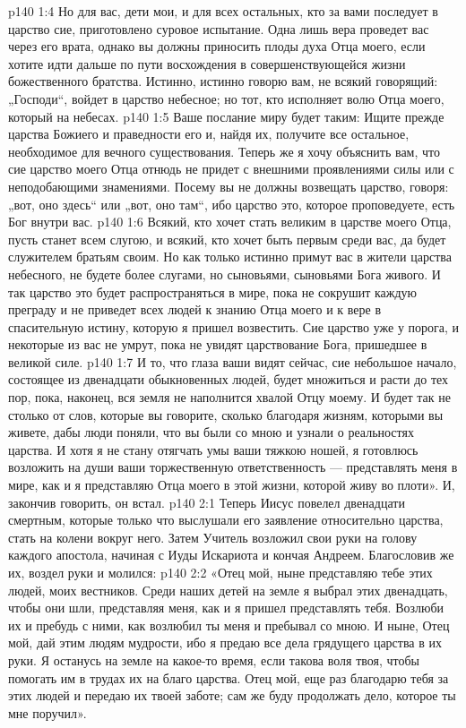 \vs p140 1:4 Но для вас, дети мои, и для всех остальных, кто за вами последует в царство сие, приготовлено суровое испытание. Одна лишь вера проведет вас через его врата, однако вы должны приносить плоды духа Отца моего, если хотите идти дальше по пути восхождения в совершенствующейся жизни божественного братства. Истинно, истинно говорю вам, не всякий говорящий: „Господи“, войдет в царство небесное; но тот, кто исполняет волю Отца моего, который на небесах.
\vs p140 1:5 Ваше послание миру будет таким: Ищите прежде царства Божиего и праведности его и, найдя их, получите все остальное, необходимое для вечного существования. Теперь же я хочу объяснить вам, что сие царство моего Отца отнюдь не придет с внешними проявлениями силы или с неподобающими знамениями. Посему вы не должны возвещать царство, говоря: „вот, оно здесь“ или „вот, оно там“, ибо царство это, которое проповедуете, есть Бог внутри вас.
\vs p140 1:6 Всякий, кто хочет стать великим в царстве моего Отца, пусть станет всем слугою, и всякий, кто хочет быть первым среди вас, да будет служителем братьям своим. Но как только истинно примут вас в жители царства небесного, не будете более слугами, но сыновьями, сыновьями Бога живого. И так царство это будет распространяться в мире, пока не сокрушит каждую преграду и не приведет всех людей к знанию Отца моего и к вере в спасительную истину, которую я пришел возвестить. Сие царство уже у порога, и некоторые из вас не умрут, пока не увидят царствование Бога, пришедшее в великой силе.
\vs p140 1:7 И то, что глаза ваши видят сейчас, сие небольшое начало, состоящее из двенадцати обыкновенных людей, будет множиться и расти до тех пор, пока, наконец, вся земля не наполнится хвалой Отцу моему. И будет так не столько от слов, которые вы говорите, сколько благодаря жизням, которыми вы живете, дабы люди поняли, что вы были со мною и узнали о реальностях царства. И хотя я не стану отягчать умы ваши тяжкою ношей, я готовлюсь возложить на души ваши торжественную ответственность --- представлять меня в мире, как и я представляю Отца моего в этой жизни, которой живу во плоти». И, закончив говорить, он встал.
\vs p140 2:1 Теперь Иисус повелел двенадцати смертным, которые только что выслушали его заявление относительно царства, стать на колени вокруг него. Затем Учитель возложил свои руки на голову каждого апостола, начиная с Иуды Искариота и кончая Андреем. Благословив же их, воздел руки и молился:
\vs p140 2:2 «Отец мой, ныне представляю тебе этих людей, моих вестников. Среди наших детей на земле я выбрал этих двенадцать, чтобы они шли, представляя меня, как и я пришел представлять тебя. Возлюби их и пребудь с ними, как возлюбил ты меня и пребывал со мною. И ныне, Отец мой, дай этим людям мудрости, ибо я предаю все дела грядущего царства в их руки. Я останусь на земле на какое\hyp{}то время, если такова воля твоя, чтобы помогать им в трудах их на благо царства. Отец мой, еще раз благодарю тебя за этих людей и передаю их твоей заботе; сам же буду продолжать дело, которое ты мне поручил».
